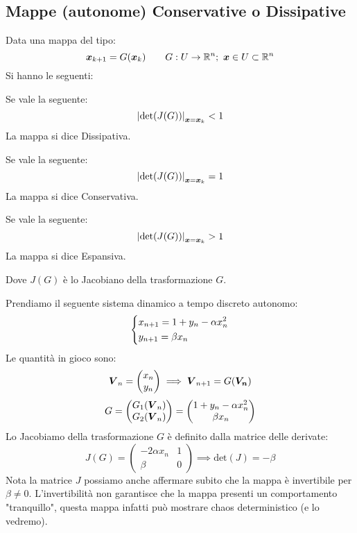 \subsection{Mappe (autonome) Conservative o Dissipative}%
\label{sub:Mappe Conservative o Dissipative}
Data una mappa del tipo:
\[
    \boldsymbol{x}_{k+1}=G(\boldsymbol{x}_k) \qquad G: U\to \mathbb{R}^n; \ \boldsymbol{x}\in U \subset \mathbb{R}^n
\] 
Si hanno le seguenti:
\begin{defn}
    Se vale la seguente:
    \[
	\left|\text{det}(J(G))\right|_{\boldsymbol{x} =\boldsymbol{x}_k} < 1
    \] 
    La mappa si dice Dissipativa.
\end{defn}
\noindent
\begin{defn}
    Se vale la seguente:
    \[
	\left|\text{det}(J(G))\right|_{\boldsymbol{x} =\boldsymbol{x}_k} = 1
    \] 
    La mappa si dice Conservativa.
\end{defn}
\noindent
\begin{defn}
    Se vale la seguente:
    \[
	\left|\text{det}(J(G))\right|_{\boldsymbol{x} =\boldsymbol{x}_k} > 1
    \] 
    La mappa si dice Espansiva.
\end{defn}
\noindent
Dove $J(G)$ è lo Jacobiano della trasformazione $G$.
\begin{exmp}
    Prendiamo il seguente sistema dinamico a tempo discreto autonomo:
    \[\begin{dcases}
        x_{n+1}=1+y_n-\alpha x_{n}^2\\
	y_{n+1}=\beta x_n
    \end{dcases}\] 
    Le quantità in gioco sono:
    \[
	\boldsymbol{V}_n = \begin{pmatrix} x_n \\ y_n \end{pmatrix}  \implies  \boldsymbol{V}_{n+1}=G(\boldsymbol{V_n})
    \] 
    \[
	G = \begin{pmatrix} G_1(\boldsymbol{V}_n) \\ G_2(\boldsymbol{V}_n)  \end{pmatrix} = \begin{pmatrix} 1+y_n-\alpha x_n^2 \\ \beta x_n\end{pmatrix} 
    \] 
    Lo Jacobiamo della trasformazione $G$ è definito dalla matrice delle derivate:
    \[
	J(G)= 
	\begin{pmatrix} 
	    -2\alpha x_n  & 1 \\
	    \beta  & 0
	\end{pmatrix} 
	\implies  \text{det}(J)=-\beta
    \] 
    Nota la matrice $J$ possiamo anche affermare subito che la mappa è invertibile per $\beta\neq 0$. L'invertibilità non garantisce che la mappa presenti un comportamento "tranquillo", questa mappa infatti può mostrare chaos deterministico (e lo vedremo).
\end{exmp}
